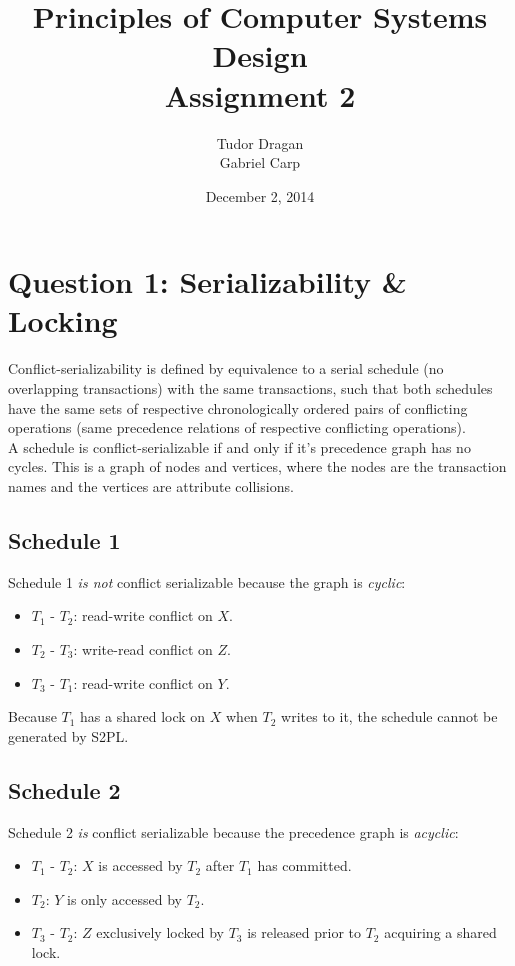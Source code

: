 \documentclass{article}      %
\title{\bf Principles of Computer Systems Design\\ {\Large Assignment 2}}  %
\author{Tudor Dragan\\
Gabriel Carp}      %
\date{December 2, 2014}      %
\begin{document}

\maketitle                   %

\section*{Question 1: Serializability \& Locking} 

Conflict-serializability is defined by equivalence to a serial schedule (no overlapping transactions) with the same transactions, such that both schedules have the same sets of respective chronologically ordered pairs of conflicting operations (same precedence relations of respective conflicting operations).\\

A schedule is conflict-serializable if and only if it's precedence graph has no cycles. This is a graph of nodes and vertices, where the nodes are the transaction names and the vertices are attribute collisions.\\

\subsection*{Schedule 1}

Schedule 1 \emph{is not} conflict serializable because the graph is \emph{cyclic}:
\begin{itemize}
\item $T_1$ - $T_2$: read-write conflict on $X$.
\item $T_2$ - $T_3$: write-read conflict on $Z$.
\item $T_3$ - $T_1$: read-write conflict on $Y$.
\end{itemize}

Because $T_1$ has a shared lock on $X$ when $T_2$ writes to it, the schedule cannot be generated by S2PL.

\subsection*{Schedule 2}

Schedule 2 \emph{is} conflict serializable because the precedence graph is \emph{acyclic}:
\begin{itemize}
\item $T_1$ - $T_2$: $X$ is accessed by $T_2$ after $T_1$ has committed.
\item $T_2$: $Y$ is only accessed by $T_2$.
\item $T_3$ - $T_2$: $Z$ exclusively locked by $T_3$ is released prior to $T_2$ acquiring a
shared lock.
\end{itemize}
\end{document}

